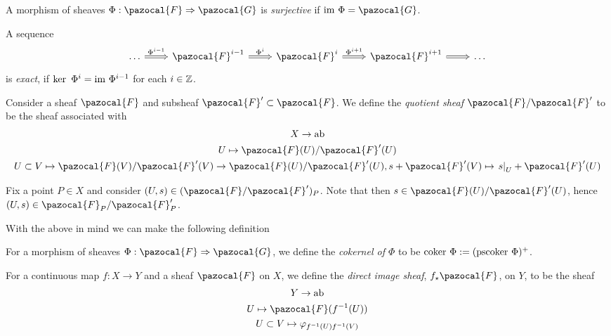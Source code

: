 \begin{definition}
    A morphism of sheaves $\Phi:\pazocal{F}\Rightarrow \pazocal{G}$ is \emph{surjective} if $\im\ \Phi = \pazocal{G}$.
\end{definition}
\begin{definition}
    A sequence 
    $$
        \begin{tikzcd}
            \dots \arrow[r, Rightarrow, "\Phi^{i-1}"] & \pazocal{F}^{i-1} \arrow[r, Rightarrow, "\Phi^i"] & \pazocal{F}^i \arrow[r, Rightarrow, "\Phi^{i+1}"] & \pazocal{F}^{i+1} \arrow[r, Rightarrow] & \dots
        \end{tikzcd}
    $$
    is \emph{exact}, if $\ker\ \Phi^i = \mathrm{im} \ \Phi^{i-1}$ for each $i \in \mathbb{Z}$. 
\end{definition}
\begin{definition}
    Consider a sheaf $\pazocal{F}$ and subsheaf $\pazocal{F}'\subset \pazocal{F}$. We define the \emph{quotient sheaf $\pazocal{F}/\pazocal{F}'$} to be the sheaf associated with 
    \begin{gather*}
        X\rightarrow \mathrm{ab}\\
        U\mapsto \pazocal{F}(U)/\pazocal{F}'(U)\\
        U\subset V \mapsto \pazocal{F}(V)/\pazocal{F}'(V) \rightarrow \pazocal{F}(U)/\pazocal{F}'(U), s + \pazocal{F}'(V) \mapsto \left. s\right|_{U}+\pazocal{F}'(U)
    \end{gather*}
\end{definition}
\begin{remark}
    Fix a point $P\in X$ and consider $(U,s)\in (\pazocal{F}/\pazocal{F}')_P$. Note that then $s\in \pazocal{F}(U)/\pazocal{F}'(U)$, hence $(U,s)\in \pazocal{F}_P/\pazocal{F}'_P$.
\end{remark}
With the above in mind we can make the following definition
\begin{definition}
    For a morphism of sheaves $\Phi : \pazocal{F}\Rightarrow \pazocal{G}$, we define the \emph{cokernel of $\Phi$} to be $\coker\ \Phi := (\mathrm{pscoker}\ \Phi)^{+}$.
\end{definition}
\begin{definition}
    For a continuous map $f : X\rightarrow Y$ and a sheaf $\pazocal{F}$ on $X$, we define the \emph{direct image sheaf}, $f_\star\pazocal{F}$, on $Y$, to be the sheaf
    \begin{gather*}
        Y \rightarrow \mathrm{ab}\\
        U \mapsto \pazocal{F}(f^{-1}(U))\\
        U\subset V \mapsto \varphi_{f^{-1}(U)f^{-1}(V)}
    \end{gather*}
\end{definition}
